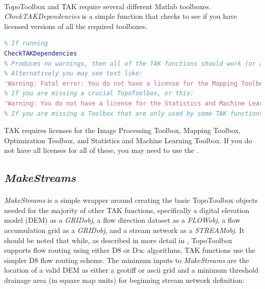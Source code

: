 \paragraph{}TopoToolbox and TAK require several different Matlab toolboxes. \textit{CheckTAKDependencies} is a simple function that checks to see if you have licensed versions of all the required toolboxes. 

\begin{lstlisting}[language=Matlab]
% CheckTAKDependencies takes no inputs and has no formal outputs
% If running 
CheckTAKDependencies
% Produces no warnings, then all of the TAK functions should work (or at least, they shouldn't fail because of missing dependencies!)
% Alternatively you may see text like:
'Warning: Fatal error: You do not have a license for the Mapping Toolbox, TopoToolbox will not function properly'
% If you are missing a crucial TopoToolbox, or this:
'Warning: You do not have a license for the Statistics and Machine Learning Toolbox, some functions will not work properly'
% If you are missing a Toolbox that are only used by some TAK functions
\end{lstlisting}

\noindent
TAK requires licenses for the Image Processing Toolbox, Mapping Toolbox, Optimization Toolbox, and Statistics and Machine Learning Toolbox. If you do not have all licenses for all of these, you may need to use the .

\subsection{\textit{MakeStreams}} \label{sec:MakeStreams}
\paragraph{}\textit{MakeStreams} is a simple wrapper around creating the basic TopoToolbox objects needed for the majority of other TAK functions, specifically a digital elevation model (DEM) as a \textit{GRIDobj}, a flow direction dataset as a \textit{FLOWobj}, a flow accumulation grid as a \textit{GRIDobj}, and a stream network as a \textit{STREAMobj}. It should be noted that while, as described in more detail in \cite{Schwanghart2014}, TopoToolbox supports flow routing using either D8 or D$\infty$ algorithms, TAK functions use the simpler D8 flow routing scheme. The minimum inputs to \textit{MakeStreams} are the location of a valid DEM as either a geotiff or ascii grid and a minimum threshold drainage area (in square map units) for beginning stream network definition:
	
